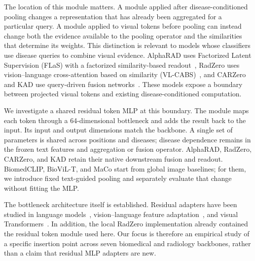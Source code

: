 \documentclass[10pt,twocolumn,letterpaper]{article}
\begin{document}
The location of this module matters. A module applied after disease-conditioned pooling changes a representation that has already been aggregated for a particular query. A module applied to visual tokens before pooling can instead change both the evidence available to the pooling operator and the similarities that determine its weights. This distinction is relevant to models whose classifiers use disease queries to combine visual evidence. AlphaRAD uses Factorized Latent Supervision (FLaS) with a factorized similarity-based readout~\cite{you2026alpharad}, RadZero uses vision--language cross-attention based on similarity (VL-CABS)~\cite{park2025radzero}, and CARZero and KAD use query-driven fusion networks~\cite{lai2024carzero,zhang2023kad}. These models expose a boundary between projected visual tokens and existing disease-conditioned computation.

We investigate a shared residual token MLP at this boundary. The module maps each token through a 64-dimensional bottleneck and adds the result back to the input. Its input and output dimensions match the backbone. A single set of parameters is shared across positions and diseases; disease dependence remains in the frozen text features and aggregation or fusion operator. AlphaRAD, RadZero, CARZero, and KAD retain their native downstream fusion and readout. BiomedCLIP, BioViL-T, and MaCo start from global image baselines; for them, we introduce fixed text-guided pooling and separately evaluate that change without fitting the MLP.

The bottleneck architecture itself is established. Residual adapters have been studied in language models~\cite{houlsby2019adapters}, vision--language feature adaptation~\cite{gao2024clipadapter}, and visual Transformers~\cite{chen2022adaptformer}. In addition, the local RadZero implementation already contained the residual token module used here. Our focus is therefore an empirical study of a specific insertion point across seven biomedical and radiology backbones, rather than a claim that residual MLP adapters are new.
\end{document}
